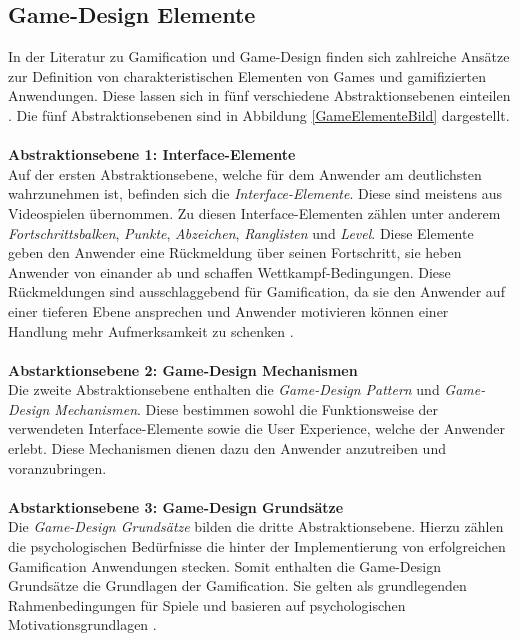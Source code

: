 \documentclass[a4paper,12pt]{scrartcl}
\begin{document}
\subsection{Game-Design Elemente}
In der Literatur zu Gamification und Game-Design finden sich zahlreiche Ansätze zur Definition von charakteristischen Elementen von Games und gamifizierten Anwendungen. Diese lassen sich in fünf verschiedene Abstraktionsebenen einteilen \cite{Deterding2011}. Die fünf Abstraktionsebenen sind in Abbildung \ref{GameElementeBild} dargestellt.
\\\\
\textbf{Abstraktionsebene 1: Interface-Elemente}\\
Auf der ersten Abstraktionsebene, welche für dem Anwender am deutlichsten wahrzunehmen ist, befinden sich die \textit{Interface-Elemente}. Diese sind meistens aus Videospielen übernommen. Zu diesen Interface-Elementen zählen unter anderem \textit{Fortschrittsbalken}, \textit{Punkte}, \textit{Abzeichen}, \textit{Ranglisten} und \textit{Level}. Diese Elemente geben den Anwender eine Rückmeldung über seinen Fortschritt, sie heben Anwender von einander ab und schaffen Wettkampf-Bedingungen. Diese Rückmeldungen sind ausschlaggebend für Gamification, da sie den Anwender auf einer tieferen Ebene ansprechen und Anwender motivieren können einer Handlung mehr Aufmerksamkeit zu schenken \cite{GameElemente2018}.
\\\\
\textbf{Abstarktionsebene 2: Game-Design Mechanismen}\\
Die zweite Abstraktionsebene enthalten die \textit{Game-Design Pattern} und \textit{Game-Design Mechanismen}. Diese bestimmen sowohl die Funktionsweise der verwendeten Interface-Elemente sowie die User Experience, welche der Anwender erlebt. Diese Mechanismen dienen dazu den Anwender anzutreiben und voranzubringen.
\\\\
\textbf{Abstarktionsebene 3: Game-Design Grundsätze}\\
Die \textit{Game-Design Grundsätze} bilden die dritte Abstraktionsebene. Hierzu zählen die psychologischen Bedürfnisse die hinter der Implementierung von erfolgreichen Gamification Anwendungen stecken. Somit enthalten die Game-Design Grundsätze die Grundlagen der Gamification. Sie gelten als grundlegenden Rahmenbedingungen für Spiele und basieren auf psychologischen Motivationsgrundlagen \cite{Werbach2012}. 
\end{document}
